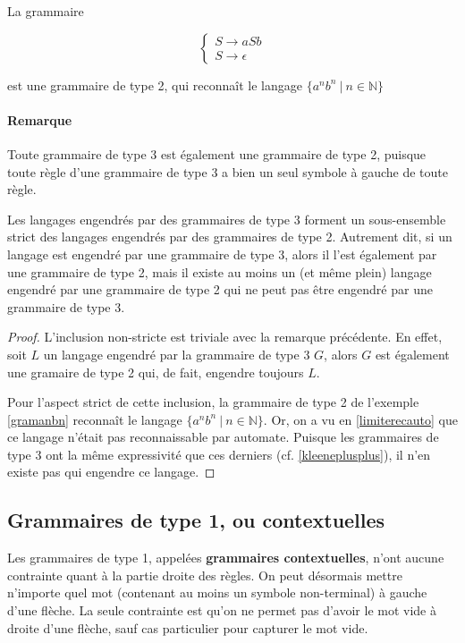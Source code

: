 \begin{example}
\label{gramanbn}
La grammaire 

\[
\begin{cases}
S \rightarrow aSb \\
S \rightarrow \epsilon
\end{cases}
\]

est une grammaire de type 2, qui reconnaît le langage $\{a^nb^n ~|~n \in \mathbb{N}\}$
\end{example}

\paragraph{Remarque} Toute grammaire de type 3 est également une grammaire de type 2, puisque toute règle d'une grammaire de type 3 a bien un seul symbole à gauche de toute règle.

\begin{lemma}
Les langages engendrés par des grammaires de type 3 forment un sous-ensemble strict des langages engendrés par des grammaires de type 2. Autrement dit, si un langage est engendré par une grammaire de type 3, alors il l'est également par une grammaire de type 2, mais il existe au moins un (et même plein) langage engendré par une grammaire de type 2 qui ne peut pas être engendré par une grammaire de type 3.  
\end{lemma}

\begin{proof}
L'inclusion non-stricte est triviale avec la remarque précédente. En effet, soit $L$ un langage engendré par la grammaire de type 3 $G$, alors $G$ est également une gramaire de type 2 qui, de fait, engendre toujours $L$.

Pour l'aspect strict de cette inclusion, la grammaire de type 2 de l'exemple \ref{gramanbn} reconnaît le langage $\{a^nb^n ~|~ n \in \mathbb{N}\}$. Or, on a vu en \ref{limiterecauto} que ce langage n'était pas reconnaissable par automate. Puisque les grammaires de type 3 ont la même expressivité que ces derniers (cf. \ref{kleeneplusplus}), il n'en existe pas qui engendre ce langage.
\end{proof}




\subsection{Grammaires de type 1, ou contextuelles}

Les grammaires de type 1, appelées \textbf{grammaires contextuelles}, n'ont aucune contrainte quant à la partie droite des règles. On peut désormais mettre n'importe quel mot (contenant au moins un symbole non-terminal) à gauche d'une flèche. La seule contrainte est qu'on ne permet pas d'avoir le mot vide à droite d'une flèche, sauf cas particulier pour capturer le mot vide.

